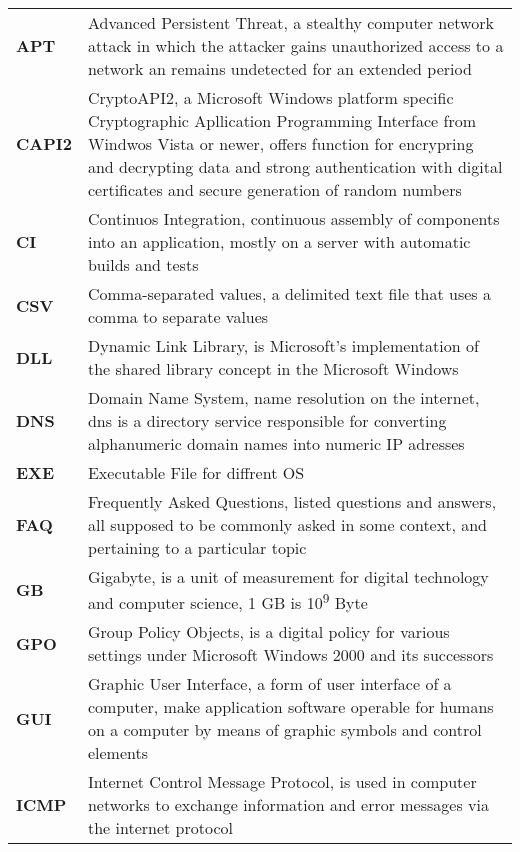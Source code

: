\setcounter{page}{6}

\def\arraystretch{1.5}
\begin{longtable}{ p{4cm}  p{12cm} } 
    \textbf{APT} & Advanced Persistent Threat, a stealthy computer network attack in which the attacker gains unauthorized access to a network an remains undetected for an extended period \\ 
    \textbf{CAPI2} & CryptoAPI2, a Microsoft Windows platform specific Cryptographic Apllication Programming Interface from Windwos Vista or newer, offers function for encrypring and decrypting data and strong authentication with digital certificates and secure generation of random numbers \\
    \textbf{CI} & Continuos Integration, continuous assembly of components into an application, mostly on a server with automatic builds and tests \\
    \textbf{CSV} & Comma-separated values, a delimited text file that uses a comma to separate values\\
    \textbf{DLL} &	Dynamic Link Library,  is Microsoft's implementation of the shared library concept in the Microsoft Windows\\
    \textbf{DNS} & Domain Name System, name resolution on the internet, dns is a directory service responsible for converting alphanumeric domain names into numeric IP adresses\\
    \textbf{EXE} & Executable File for diffrent OS\\
    \textbf{FAQ} & Frequently Asked Questions, listed questions and answers, all supposed to be commonly asked in some context, and pertaining to a particular topic\\
    \textbf{GB} & Gigabyte, is a unit of measurement for digital technology and computer science, 1 GB is 10\textsuperscript{9} Byte\\
    \textbf{GPO} & Group Policy Objects, is a digital policy for various settings under Microsoft Windows 2000 and its successors \\
    \textbf{GUI} &	Graphic User Interface, a form of user interface of a computer, make application software operable for humans on a computer by means of graphic symbols and control elements\\
    \textbf{ICMP} & Internet Control Message Protocol, is used in computer networks to exchange information and error messages via the internet protocol\\

\end{longtable}
